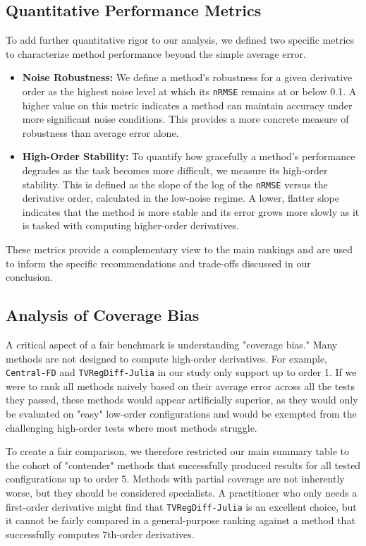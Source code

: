 \subsection{Quantitative Performance Metrics}
To add further quantitative rigor to our analysis, we defined two specific metrics to characterize method performance beyond the simple average error.
\begin{itemize}
    \item \textbf{Noise Robustness:} We define a method's robustness for a given derivative order as the highest noise level at which its \texttt{nRMSE} remains at or below 0.1. A higher value on this metric indicates a method can maintain accuracy under more significant noise conditions. This provides a more concrete measure of robustness than average error alone.
    \item \textbf{High-Order Stability:} To quantify how gracefully a method's performance degrades as the task becomes more difficult, we measure its high-order stability. This is defined as the slope of the log of the \texttt{nRMSE} versus the derivative order, calculated in the low-noise regime. A lower, flatter slope indicates that the method is more stable and its error grows more slowly as it is tasked with computing higher-order derivatives.
\end{itemize}
These metrics provide a complementary view to the main rankings and are used to inform the specific recommendations and trade-offs discussed in our conclusion.

\subsection{Analysis of Coverage Bias}
A critical aspect of a fair benchmark is understanding "coverage bias." Many methods are not designed to compute high-order derivatives. For example, \texttt{Central-FD} and \texttt{TVRegDiff-Julia} in our study only support up to order 1. If we were to rank all methods naively based on their average error across all the tests they passed, these methods would appear artificially superior, as they would only be evaluated on "easy" low-order configurations and would be exempted from the challenging high-order tests where most methods struggle.

To create a fair comparison, we therefore restricted our main summary table to the cohort of "contender" methods that successfully produced results for all tested configurations up to order 5. Methods with partial coverage are not inherently worse, but they should be considered specialists. A practitioner who only needs a first-order derivative might find that \texttt{TVRegDiff-Julia} is an excellent choice, but it cannot be fairly compared in a general-purpose ranking against a method that successfully computes 7th-order derivatives.

